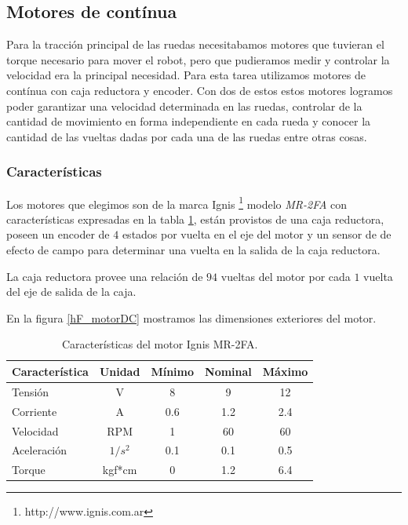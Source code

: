 \subsection{Motores de cont\'inua}
\label{h_actuadores_motorDC}

Para la tracci\'on principal de las ruedas necesitabamos motores que tuvieran el torque necesario para mover el robot, pero que pudieramos medir y
controlar la velocidad era la principal necesidad. Para esta tarea utilizamos motores de cont\'inua con caja reductora y encoder.
Con dos de estos estos motores logramos poder garantizar una velocidad determinada en las ruedas, controlar de la cantidad de movimiento en forma
independiente en cada rueda y conocer la cantidad de las vueltas dadas por cada una de las ruedas entre otras cosas.

\subsubsection{Caracter\'isticas}
\label{h_actuadores_motorDC_caracteristicas}

Los motores que elegimos son de la marca Ignis \footnote{http://www.ignis.com.ar} modelo \emph{MR-2FA} con caracter\'isticas expresadas en la tabla
\ref{hT_motorDC}, est\'an provistos de una caja reductora, poseen un encoder de $4$ estados por vuelta en el eje del motor y un sensor de de efecto
de campo para determinar una vuelta en la salida de la caja reductora.

La caja reductora provee una relaci\'on de $94$ vueltas del motor por cada $1$ vuelta del eje de salida de la caja.

En la figura \ref{hF_motorDC} mostramos las dimensiones exteriores del motor.

\begin{table}
	\begin{center}
		\begin{tabular}{|l|c|c|c|c|}
			\hline
			Caracter\'istica & Unidad & M\'inimo & Nominal & M\'aximo \\
			\hline
			Tensi\'on & V & 8 & 9 & 12 \\
			Corriente & A & 0.6 & 1.2 & 2.4 \\
			Velocidad & RPM & 1 & 60 & 60 \\
			Aceleraci\'on & $1/s^{2}$ & 0.1 & 0.1 & 0.5 \\
			Torque & kgf*cm & 0 & 1.2 & 6.4 \\
			\hline
		\end{tabular}
	\end{center}
	\caption{Caracter\'isticas del motor Ignis MR-2FA.}
	\label{hT_motorDC}
\end{table}

